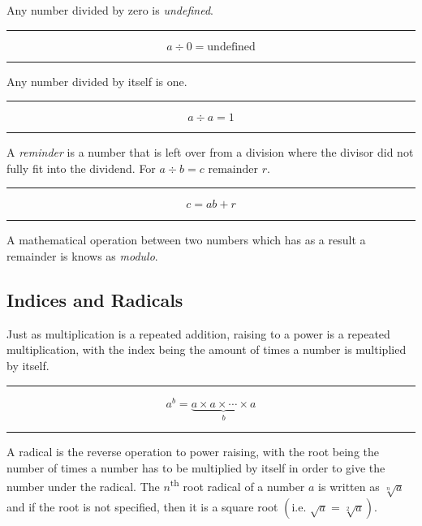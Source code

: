 \documentclass[a5paper,9pt]{book}
\theoremstyle{definition}
\newcommand{\txtlinesur}[1]{%
    \vspace*{\baselineskip}

    \hrule%

    \vspace*{\medskipamount}

    #1

    \vspace*{\medskipamount}

    \hrule%

    \vspace*{\baselineskip}
}
\newcommand{\eqlinesur}[1]{%
    \vspace*{\baselineskip}

    \hrule%

    \vspace*{\medskipamount}

    #1

    \vspace*{\medskipamount-0.5\belowdisplayskip}

    \hrule%

    \vspace*{\baselineskip}
}
\begin{document}
                \pagebreak

                Any number divided by zero is \emph{undefined}.

                \txtlinesur{%
                    \begin{equation*}
                        a\div 0 = \text{undefined}
                    \end{equation*}
                }

                Any number divided by itself is one.

                \txtlinesur{%
                    \begin{equation*}
                        a\div a = 1
                    \end{equation*}
                }

                A \emph{reminder} is a number that is left over from a division where
                the divisor did not fully fit into the dividend. For $a\div b = c \text{ remainder } r$.

                \txtlinesur{
                    \begin{equation*}
                        c = ab + r
                    \end{equation*}
                }

                A mathematical operation between two numbers which has as a result 
                a remainder is knows as \emph{modulo}.

                \subsection{Indices and Radicals}

                Just as multiplication is a repeated addition, raising to a power is a
                repeated multiplication, with the index being the amount of times a number
                is multiplied by itself.

                \eqlinesur{%
                    \begin{equation*}
                        a^b = \underset{b}{\underbrace{a\times a\times\cdots\times a}}
                    \end{equation*}
                }

                A radical is the reverse operation to power raising, with the root being
                the number of times a number has to be multiplied by itself in order to
                give the number under the radical. The $n$\textsuperscript{th} root radical
                of a number $a$ is written as $\sqrt[n]{a}$ and if the root is not specified,
                then it is a square root $\left(\text{i.e.\ }\sqrt{a} = \sqrt[2]{a}\right)$.
\end{document}
